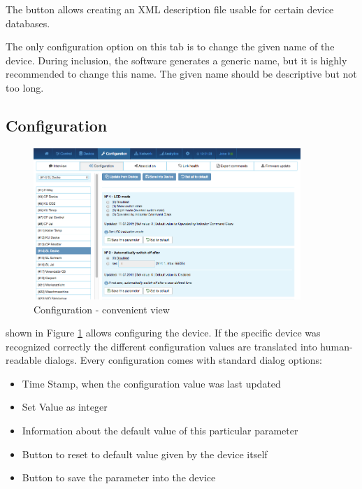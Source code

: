 The button  allows creating an XML description file usable for 
certain device databases.

The only configuration option on this tab is to change the given name of the device. 
During inclusion, the software generates a generic name, but it is highly recommended 
to change this name. The given name should be descriptive but not too long.

\subsection{Configuration}

\begin{figure}
\begin{center}
\includegraphics[width=0.9\textwidth]{pngs/cap7/eui32.png}
\caption{Configuration - convenient view}
\label{eui32}
\end{center}
\end{figure}

 shown in Figure \ref{eui32} allows configuring the device. If the 
specific device was recognized correctly the different configuration values are translated 
into human-readable dialogs. Every configuration comes with standard dialog options:

\begin{itemize}
\item Time Stamp, when the configuration value was last updated
\item Set Value as integer
\item Information about the default value of this particular parameter
\item Button to reset to default value given by the device itself
\item Button to save the parameter into the device
\end{itemize}

